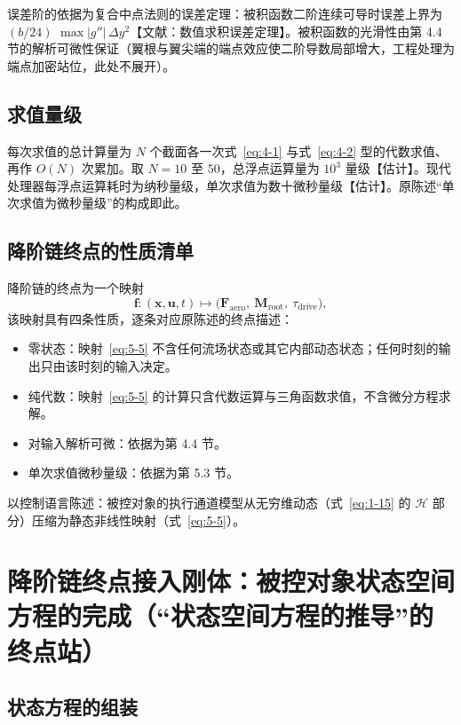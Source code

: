 \documentclass[11pt,a4paper]{ctexart}
\numberwithin{equation}{section}
\begin{document}
误差阶的依据为复合中点法则的误差定理：被积函数二阶连续可导时误差上界为 $(b/24)$ $\max|g''|\,\Delta y^2$【文献：数值求积误差定理】。被积函数的光滑性由第 4.4 节的解析可微性保证（翼根与翼尖端的端点效应使二阶导数局部增大，工程处理为端点加密站位，此处不展开）。

\subsection{求值量级}

每次求值的总计算量为 $N$ 个截面各一次式~\eqref{eq:4-1} 与式~\eqref{eq:4-2} 型的代数求值、再作 $O(N)$ 次累加。取 $N = 10$ 至 $50$，总浮点运算量为 $10^3$ 量级【估计】。现代处理器每浮点运算耗时为纳秒量级，单次求值为数十微秒量级【估计】。原陈述“单次求值为微秒量级”的构成即此。

\subsection{降阶链终点的性质清单}

降阶链的终点为一个映射
\begin{equation}
  \bm{f}\colon (\bm{x}, \bm{u}, t) \mapsto \bigl(\bm{F}_{\text{aero}},\ \bm{M}_{\text{root}},\ \tau_{\text{drive}}\bigr), \label{eq:5-5}
\end{equation}
该映射具有四条性质，逐条对应原陈述的终点描述：

\begin{itemize}
  \item 零状态：映射~\eqref{eq:5-5} 不含任何流场状态或其它内部动态状态；任何时刻的输出只由该时刻的输入决定。
  \item 纯代数：映射~\eqref{eq:5-5} 的计算只含代数运算与三角函数求值，不含微分方程求解。
  \item 对输入解析可微：依据为第 4.4 节。
  \item 单次求值微秒量级：依据为第 5.3 节。
\end{itemize}

以控制语言陈述：被控对象的执行通道模型从无穷维动态（式~\eqref{eq:1-15} 的 $\mathcal{H}$ 部分）压缩为静态非线性映射（式~\eqref{eq:5-5}）。

\section{降阶链终点接入刚体：被控对象状态空间方程的完成（“状态空间方程的推导”的终点站）}\label{sec:assembly}

\subsection{状态方程的组装}
\end{document}
